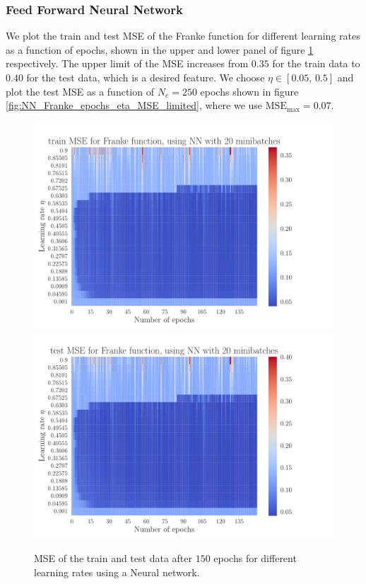 \documentclass[12pt]{extarticle}
\begin{document}
\subsubsection{Feed Forward Neural Network}

We plot the train and test MSE of the Franke function for different learning rates as a function of epochs, shown in the upper and lower panel of figure \ref{fig:NN_Franke_epochs_eta_MSE} respectively. The upper limit of the MSE increases from $0.35$ for the train data to $0.40$ for the test data, which is a desired feature. We choose $\eta\in[0.05,\,0.5]$ and plot the test MSE as a function of $N_e=250$ epochs shown in figure \ref{fig:NN_Franke_epochs_eta_MSE_limited}, where we use $\mathrm{MSE}_\mathrm{max}=0.07$.

\begin{figure}[h!]
	\includegraphics[width=\linewidth]{NN_Franke/NN_Franke__epochs_eta__train_MSE__569887.pdf}
	\includegraphics[width=\linewidth]{NN_Franke/NN_Franke__epochs_eta__test_MSE__271070.pdf}
	\caption{MSE of the train and test data after $150$ epochs for different learning rates using a Neural network.}
	\label{fig:NN_Franke_epochs_eta_MSE}
\end{figure}
\end{document}
